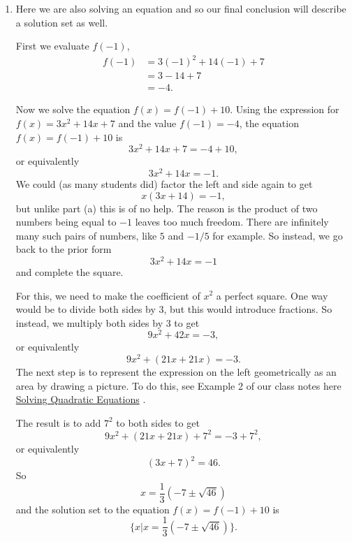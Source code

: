 \documentclass{ximera}
\begin{document}
\begin{question}
\begin{explanation}
\begin{enumerate}
\item Here we are also solving an equation and so our final conclusion will describe a solution set as well.

First we evaluate $f(-1)$,
\begin{align*}
    f(-1) &= 3(-1)^2 + 14(-1) + 7  \\
           &= 3 - 14 + 7 \\
           &= -4.
\end{align*}

Now we solve the equation $f(x) = f(-1) + 10$. Using the expression for $f(x) = 3x^2 + 14x +7$ and the value $f(-1)=-4$, the equation $f(x) = f(-1)+10$ is
\[
        3x^2 + 14x + 7 = -4 + 10 ,
\]
or equivalently
\[
   3x^2 + 14x = -1.
\]
We could (as many students did) factor the left and side again to get
\[
    x(3x+14) = -1,
\]
but unlike part (a) this is of no help. The reason is the product of two numbers being equal to $-1$ leaves too much freedom. There are infinitely many such pairs of numbers, like $5$ and $-1/5$ for example. So instead, we go back to the prior form
\[
   3x^2 + 14x = -1
\]
and complete the square. 

For this, we need to make the coefficient of $x^2$ a perfect square. One way would be to divide both sides by $3$, but this would introduce fractions. So instead, we multiply both sides by $3$ to get
\[
    9x^2 + 42x = -3 ,
\]
or equivalently
\[
        9x^2 + (21x + 21x) = -3.
\]
The next step is to represent the expression on the left geometrically as an area by drawing a picture. To do this, see Example 2 of our class notes here \href{https://ximera.osu.edu/precalc1/PreCalculus1/SolvingQuadraticEqs/SolvingQuadraticEqs}{Solving Quadratic Equations} .

The result is to add $7^2$ to both sides to get
\[
  9x^2 + (21x + 21x) + 7^2 = -3 + 7^2, 
\]
or equivalently
\[
 (3x + 7)^2 = 46.
\]
So 
\[
   x = \frac{1}{3}\left(-7 \pm \sqrt{46}  \right)
\]
and the solution set to the equation $f(x) = f(-1)+10$ is 
\[
 \{  x |   x = \frac{1}{3}\left(-7 \pm \sqrt{46}  \right)\} .
\]
\end{enumerate}
\end{explanation}
\end{question}
\end{document}
